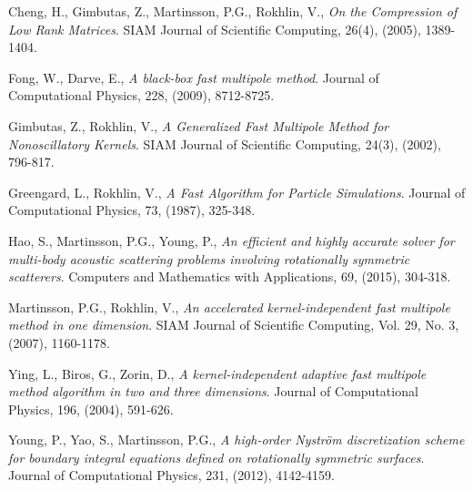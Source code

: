 \documentclass[11pt, oneside]{article}   	%
\begin{document}
\begin{thebibliography}{99}

 Cheng, H., Gimbutas, Z., Martinsson, P.G., Rokhlin, V., \emph{On the Compression of Low Rank Matrices}. SIAM Journal of Scientific Computing, 26(4), (2005), 1389-1404.

 Fong, W., Darve, E., \emph{A black-box fast multipole method}. Journal of Computational Physics, 228, (2009), 8712-8725.

 Gimbutas, Z., Rokhlin, V., \emph{A Generalized Fast Multipole Method for Nonoscillatory Kernels}. SIAM Journal of Scientific Computing, 24(3), (2002), 796-817.

 Greengard, L., Rokhlin, V., \emph{A Fast Algorithm for Particle Simulations}. Journal of Computational Physics, 73, (1987), 325-348.

 Hao, S., Martinsson, P.G., Young, P., \emph{An efficient and highly accurate solver for multi-body acoustic scattering problems involving rotationally symmetric scatterers}. Computers and Mathematics with Applications, 69, (2015), 304-318.

 Martinsson, P.G., Rokhlin, V., \emph{An accelerated kernel-independent fast multipole method in one dimension}. SIAM Journal of Scientific Computing, Vol. 29, No. 3, (2007), 1160-1178.

 Ying, L., Biros, G., Zorin, D., \emph{A kernel-independent adaptive fast multipole method algorithm in two and three dimensions}. Journal of Computational Physics, 196, (2004), 591-626.

 Young, P., Yao, S., Martinsson, P.G., \emph{A high-order Nystr{\"o}m discretization scheme for boundary integral equations defined on rotationally symmetric surfaces}. Journal of Computational Physics, 231, (2012), 4142-4159.

\end{thebibliography}
\end{document}
